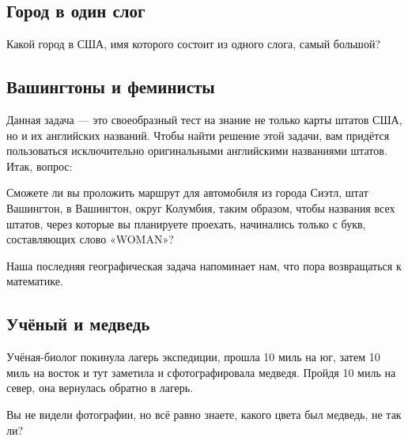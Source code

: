 \subsection*{Город в один слог}%

Какой город в США, имя которого состоит из одного слога, самый большой? 

\subsection*{Вашингтоны и феминисты}%

Данная задача --- это своеобразный тест на знание не только карты штатов США, но и их английских названий.
Чтобы найти решение этой задачи, вам придётся пользоваться исключительно оригинальными английскими названиями штатов.
Итак, вопрос: 

Сможете ли вы проложить маршрут для автомобиля из города Сиэтл, штат Вашингтон, 
 в Вашингтон, округ Колумбия, таким образом, чтобы названия всех штатов, через которые вы планируете проехать, начинались только с букв, составляющих слово «WOMAN»?

\medskip

Наша последняя географическая задача напоминает нам, что пора возвращаться к математике. %

\subsection*{Учёный и медведь}%

Учёная-биолог покинула лагерь экспедиции, прошла 10 миль на юг, затем 10 миль на восток и тут заметила и сфотографировала медведя.
Пройдя 10 миль на север, она вернулась обратно в лагерь.

\medskip

Вы не видели фотографии, но всё равно знаете, какого цвета был медведь, не так ли?

